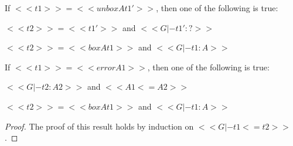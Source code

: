 \begin{lemma}
\begin{enumR}
  \item If $<<t1>> = <<unbox A t1'>>$,
    then one of the following is true:
    \begin{enumA}
    \item $<<t2>> = <<t1'>>$ and $<<G |- t1' : ?>>$
    \item $<<t2>> = <<box A t1>>$ and $<<G |- t1 : A>>$
    \end{enumA}

  \item If $<<t1>> = <<error A1>>$,
    then one of the following is true:
    \begin{enumA}
    \item $<<G |- t2 : A2>>$ and $<<A1 <= A2>>$
    \item $<<t2>> = <<box A t1>>$ and $<<G |- t1 : A>>$
    \end{enumA}
  \end{enumR}
\end{lemma}
\begin{proof}
  The proof of this result holds by induction
  on $<<G |- t1 <= t2>>$.
\end{proof}
